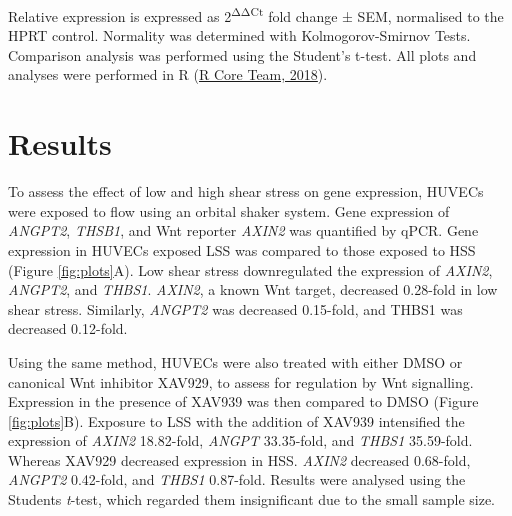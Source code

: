 \documentclass[
  11pt,
]{article}
\begin{document}
Relative expression is expressed as 2\textsuperscript{ΔΔCt} fold change ± SEM, normalised to the HPRT control.
Normality was determined with Kolmogorov-Smirnov Tests.
Comparison analysis was performed using the Student's t-test.
All plots and analyses were performed in R (\protect\hyperlink{ref-R}{R Core Team, 2018}).

\hypertarget{results}{%
\section{Results}\label{results}}

To assess the effect of low and high shear stress on gene expression, HUVECs were exposed to flow using an orbital shaker system.
Gene expression of \emph{ANGPT2}, \emph{THSB1}, and Wnt reporter \emph{AXIN2} was quantified by qPCR.
Gene expression in HUVECs exposed LSS was compared to those exposed to HSS (Figure \ref{fig:plots}A).
Low shear stress downregulated the expression of \emph{AXIN2}, \emph{ANGPT2}, and \emph{THBS1}.
\emph{AXIN2}, a known Wnt target, decreased 0.28-fold in low shear stress.
Similarly, \emph{ANGPT2} was decreased 0.15-fold, and THBS1 was decreased 0.12-fold.

Using the same method, HUVECs were also treated with either DMSO or canonical Wnt inhibitor XAV929, to assess for regulation by Wnt signalling.
Expression in the presence of XAV939 was then compared to DMSO (Figure \ref{fig:plots}B).
Exposure to LSS with the addition of XAV939 intensified the expression of \emph{AXIN2} 18.82-fold, \emph{ANGPT} 33.35-fold, and \emph{THBS1} 35.59-fold.
Whereas XAV929 decreased expression in HSS.
\emph{AXIN2} decreased 0.68-fold, \emph{ANGPT2} 0.42-fold, and \emph{THBS1} 0.87-fold.
Results were analysed using the Students \emph{t}-test, which regarded them insignificant due to the small sample size.
\end{document}
